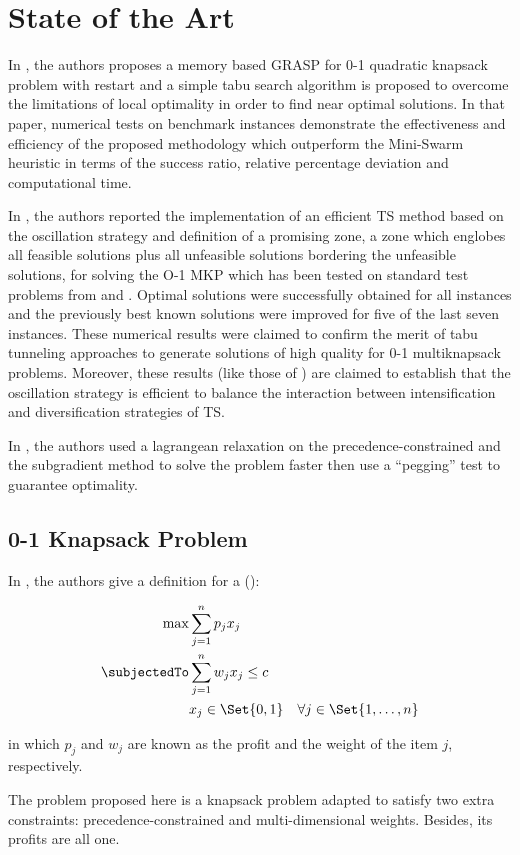 \section{State of the Art}

In \cite{bib:grasp-and-tabu}, the authors proposes a memory based GRASP for 0-1
quadratic knapsack problem with restart and a simple tabu search algorithm is proposed to overcome the limitations of local optimality in order to find near optimal solutions. In that paper, numerical tests on benchmark instances demonstrate the effectiveness and efficiency of the proposed methodology which outperform the Mini-Swarm heuristic in terms of the success ratio, relative percentage deviation and computational time.

In \cite{bib:tabu-knapsack}, the authors reported the implementation of an efficient TS method based on the oscillation strategy and definition of a promising zone, a zone which englobes all feasible solutions plus all unfeasible solutions bordering the unfeasible solutions, for solving the O-1 MKP which has been tested on standard test problems from \cite{bib:freville,bib:preprocessing-knapsack-1994} and \cite{bib:tabu-multidimensional-knapsack}. Optimal solutions were successfully obtained for all instances and the previously best known solutions were improved for five of the last seven instances. These numerical results were claimed to confirm the merit of tabu tunneling approaches to generate solutions of high quality for 0-1 multiknapsack problems. Moreover, these results (like those of \cite{bib:tabu-multidimensional-knapsack}) are claimed to establish that the oscillation strategy is efficient to balance the interaction between intensification and diversification strategies of TS.

In \cite{bib:constrained-knapsack}, the authors used a lagrangean relaxation on the precedence-constrained and the subgradient method to solve the problem faster then use a ``pegging'' test to guarantee optimality.


\subsection{0-1 Knapsack Problem}

In \cite{bib:knapsack-problems}, the authors give a definition for a \zoKPV (\zoKP):

\begin{eqnarray}
    \label{problem:knapsack-problem}
    \max & \displaystyle\sum\limits_{j=1}^{n} p_j x_j \\
    \subjectedTo
        & \displaystyle\sum\limits_{j=1}^{n} w_j x_j \leq c \nonumber\\
        & x_j \in \Set{0, 1} \quad \forall j \in \Set{1, \dots, n} \nonumber
\end{eqnarray}

in which $p_j$ and $w_j$ are known as the profit and the weight of the item $j$, respectively.

The problem proposed here is a knapsack problem adapted to satisfy two extra constraints: precedence-constrained and multi-dimensional weights. Besides, its profits are all one.
